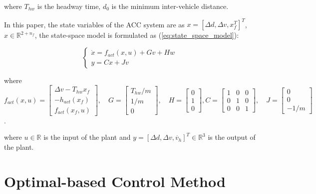 \documentclass{article}
\numberwithin{equation}{section}
\begin{document}
\noindent where $T_{hw}$ is the headway time, $d_0$ is the minimum inter-vehicle distance.

In this paper, the state variables of the ACC system are as $x=[\Delta d,\Delta
    v,x_f^T]^T$, $x\in \mathbb{R}^{2+n_f}$, the state-space model is formulated as
(\ref{eq:state_space_model}):

\begin{equation}
    \left\{\begin{array}{l}\label{eq:state_space_model}
        \dot{x}=f_{a c t}\left(x, u\right) + Gv + Hw \\
        y=Cx+Jv
    \end{array}\right.
\end{equation}

\noindent where
$f_{a c t}(x,u)=\left[\begin{array}{c}
            \Delta v-T_{h w} x_{f}       \\
            -h_{a c t}\left(x_{f}\right) \\
            f_{a c t}\left(x_{f}, u\right)
        \end{array}\right], \quad G=\left[\begin{array}{c}
            T_{h w} / m \\
            1 / m       \\
            0
        \end{array}\right], \quad H=\left[\begin{array}{l}
            0 \\
            1 \\
            0
        \end{array}\right],C=\left[\begin{array}{lll}
            1 & 0 & 0 \\
            0 & 1 & 0 \\
            0 & 0 & 1
        \end{array}\right], \quad J=\left[\begin{array}{c}
            0 \\
            0 \\
            -1 / m
        \end{array}\right]$.

\noindent where $u \in \mathbb{R}$ is the input of the plant and
$y = [\Delta d, \Delta v, \dot{v_h}]^T \in \mathbb{R}^{3}$ is the output of the plant.

\section{Optimal-based Control Method}
\end{document}
